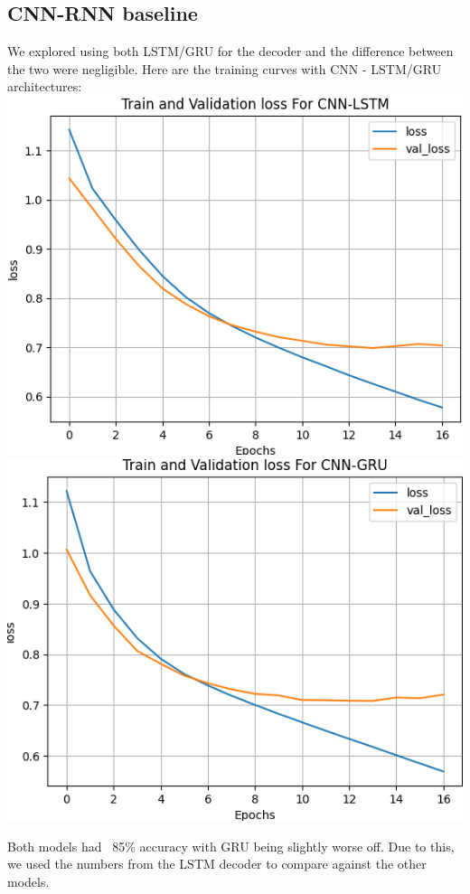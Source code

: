 \documentclass{article}
\begin{document}
\subsection{CNN-RNN baseline}
We explored using both LSTM/GRU for the decoder and the difference between the two were negligible. Here are the training curves with CNN - LSTM/GRU architectures:
\newline \newline
 \includegraphics[scale=0.45]{lstm_training.png}
 \includegraphics[scale=0.45]{gru_training.png}

Both models had ~85\% accuracy with GRU being slightly worse off. Due to this, we used the numbers from the LSTM decoder to compare against the other models. 
\end{document}
